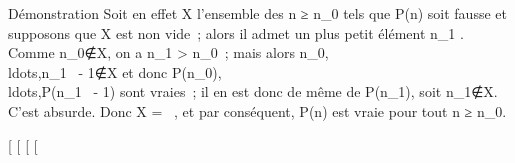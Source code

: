 \documentclass[]{article}
\begin{document}
Démonstration Soit en effet X l'ensemble des n ≥ n\_0 tels que
P(n) soit fausse et supposons que X est non vide~; alors il admet un
plus petit élément n\_1 \inX. Comme
n\_0∉X, on a n\_1
\textgreater{} n\_0~; mais alors
n\_0,\\ldots,n\_1~
- 1∉X et donc
P(n\_0),\\ldots,P(n\_1~
- 1) sont vraies~; il en est donc de même de P(n\_1), soit
n\_1∉X. C'est absurde. Donc X = \varnothing~, et
par conséquent, P(n) est vraie pour tout n ≥ n\_0.

{[}
{[}
{[}
{[}
\end{document}
